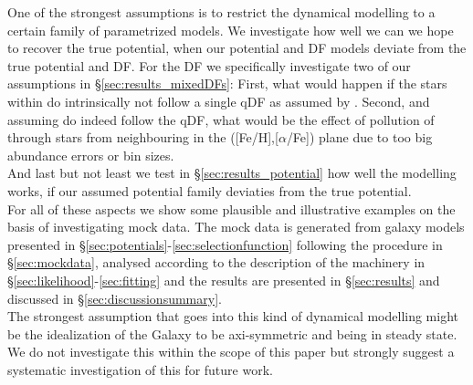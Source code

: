 One of the strongest assumptions is to restrict the dynamical modelling to a certain family of parametrized models. We investigate how well we can we hope to recover the true potential, when our potential and DF models deviate from the true potential and DF. For the DF we specifically investigate two of our assumptions in \S\ref{sec:results_mixedDFs}: First, what would happen if the stars within \MAPs do intrinsically not follow a single qDF as assumed by \citet{tin13,bov13}. Second, and assuming \MAPs do indeed follow the qDF, what would be the effect of pollution of \MAPs through stars from neighbouring \MAPs in the ([Fe/H],[$\alpha$/Fe]) plane due to too big abundance errors or bin sizes.\\
And last but not least we test in \S\ref{sec:results_potential} how well the modelling works, if our assumed potential family deviaties from the true potential. \\

For all of these aspects we show some plausible and illustrative examples on the basis of investigating mock data. The mock data is generated from galaxy models presented in \S\ref{sec:potentials}-\ref{sec:selectionfunction} following the procedure in \S\ref{sec:mockdata}, analysed according to the description of the machinery in \S\ref{sec:likelihood}-\ref{sec:fitting} and the results are presented in \S\ref{sec:results} and discussed in \S\ref{sec:discussionsummary}.\\

The strongest assumption that goes into this kind of dynamical modelling might be the idealization of the Galaxy to be axi-symmetric and being in steady state. We do not investigate this within the scope of this paper but strongly suggest a systematic investigation of this for future work.

